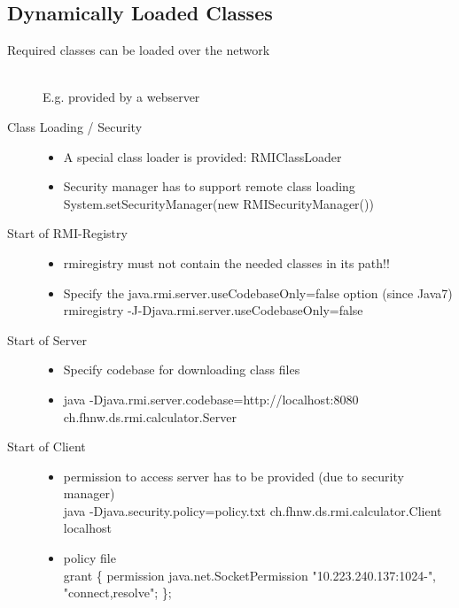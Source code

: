 \documentclass[10pt]{article}
\begin{document}
\subsection{Dynamically Loaded Classes}
\begin{description}
	\item[Required classes can be loaded over the network] \hfill \\
		E.g. provided by a webserver
	\item[Class Loading / Security] \hfill
		\begin{itemize}
			\item A special class loader is provided: RMIClassLoader
			\item Security manager has to support remote class loading \\
				System.setSecurityManager(new RMISecurityManager())
		\end{itemize}
	\item[Start of RMI-Registry] \hfill
		\begin{itemize}
			\item rmiregistry must not contain the needed classes in its path!!
			\item Specify the java.rmi.server.useCodebaseOnly=false option (since Java7) \\
				rmiregistry -J-Djava.rmi.server.useCodebaseOnly=false
		\end{itemize}
	\item[Start of Server] \hfill
		\begin{itemize}
			\item Specify codebase for downloading class files
			\item java -Djava.rmi.server.codebase=http://localhost:8080 ch.fhnw.ds.rmi.calculator.Server
		\end{itemize}
	\item[Start of Client] \hfill
		\begin{itemize}
			\item permission to access server has to be provided (due to security manager)	\\
				java -Djava.security.policy=policy.txt ch.fhnw.ds.rmi.calculator.Client localhost
			\item policy file \\
				grant \{ permission java.net.SocketPermission "10.223.240.137:1024-",  "connect,resolve"; \}; 
		\end{itemize}
\end{description}
\end{document}
